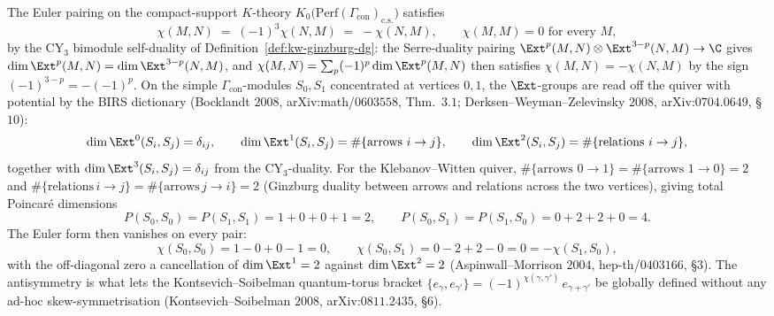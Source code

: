 \begin{proposition}
\label{prop:kw-euler-antisymmetric}
The Euler pairing on the compact-support $K$-theory $K_0\bigl(\mathrm{Perf}(\Gamma_{\mathrm{con}})_{\mathrm{c.s.}}\bigr)$ satisfies
\[
 \chi(M, N) \;=\; (-1)^3 \chi(N, M) \;=\; -\chi(N, M), \qquad \chi(M, M) = 0 \text{ for every } M,
\]
by the $\mathrm{CY}_3$ bimodule self-duality of Definition~\ref{def:kw-ginzburg-dg}: the Serre-duality pairing $\Ext^p(M, N) \otimes \Ext^{3-p}(N, M) \to \C$ gives $\dim \Ext^p(M, N) = \dim \Ext^{3-p}(N, M)$, and $\chi(M, N) = \sum_p (-1)^p \dim \Ext^p(M, N)$ then satisfies $\chi(M, N) = -\chi(N, M)$ by the sign $(-1)^{3-p} = -(-1)^p$. On the simple $\Gamma_{\mathrm{con}}$-modules $S_0, S_1$ concentrated at vertices $0, 1$, the $\Ext$-groups are read off the quiver with potential by the BIRS dictionary (Bocklandt $2008$, arXiv:math/$0603558$, Thm.~$3.1$; Derksen--Weyman--Zelevinsky $2008$, arXiv:$0704.0649$, \S$10$):
\[
 \dim \Ext^0(S_i, S_j) = \delta_{ij}, \qquad
 \dim \Ext^1(S_i, S_j) = \#\{\text{arrows } i \to j\}, \qquad
 \dim \Ext^2(S_i, S_j) = \#\{\text{relations } i \to j\},
\]
together with $\dim \Ext^3(S_i, S_j) = \delta_{ij}$ from the $\mathrm{CY}_3$-duality. For the Klebanov--Witten quiver, $\#\{\text{arrows } 0 \to 1\} = \#\{\text{arrows } 1 \to 0\} = 2$ and $\#\{\text{relations}\,i \to j\} = \#\{\text{arrows}\,j \to i\} = 2$ (Ginzburg duality between arrows and relations across the two vertices), giving total Poincar\'e dimensions
\[
 P(S_0, S_0) = P(S_1, S_1) = 1 + 0 + 0 + 1 = 2, \qquad
 P(S_0, S_1) = P(S_1, S_0) = 0 + 2 + 2 + 0 = 4.
\]
The Euler form then vanishes on every pair:
\[
 \chi(S_0, S_0) = 1 - 0 + 0 - 1 = 0, \qquad \chi(S_0, S_1) = 0 - 2 + 2 - 0 = 0 = -\chi(S_1, S_0),
\]
with the off-diagonal zero a cancellation of $\dim \Ext^1 = 2$ against $\dim \Ext^2 = 2$ (Aspinwall--Morrison $2004$, hep-th/$0403166$, \S$3$). The antisymmetry is what lets the Kontsevich--Soibelman quantum-torus bracket $\{e_\gamma, e_{\gamma'}\} = (-1)^{\chi(\gamma, \gamma')}\, e_{\gamma + \gamma'}$ be globally defined without any ad-hoc skew-symmetrisation (Kontsevich--Soibelman $2008$, arXiv:$0811.2435$, \S$6$).
\end{proposition}

